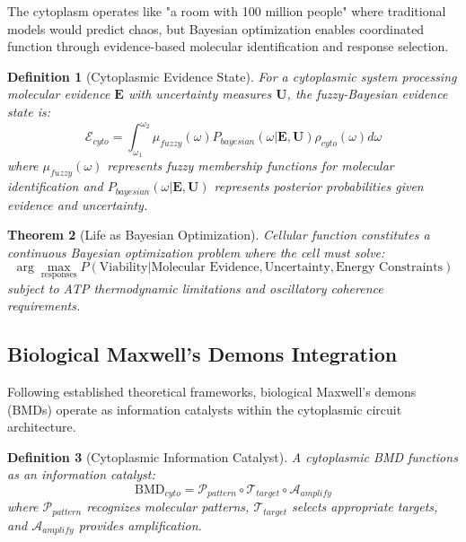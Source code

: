 \documentclass[12pt,a4paper]{article}
\newtheorem{theorem}{Theorem}[section]
\newtheorem{definition}[theorem]{Definition}
\begin{document}
The cytoplasm operates like "a room with 100 million people" where traditional models would predict chaos, but Bayesian optimization enables coordinated function through evidence-based molecular identification and response selection.

\begin{definition}[Cytoplasmic Evidence State]
For a cytoplasmic system processing molecular evidence $\mathbf{E}$ with uncertainty measures $\mathbf{U}$, the fuzzy-Bayesian evidence state is:
\begin{equation}
\mathcal{E}_{cyto} = \int_{\omega_1}^{\omega_2} \mu_{fuzzy}(\omega) P_{bayesian}(\omega | \mathbf{E}, \mathbf{U}) \rho_{cyto}(\omega) d\omega
\end{equation}
where $\mu_{fuzzy}(\omega)$ represents fuzzy membership functions for molecular identification and $P_{bayesian}(\omega | \mathbf{E}, \mathbf{U})$ represents posterior probabilities given evidence and uncertainty.
\end{definition}

\begin{theorem}[Life as Bayesian Optimization]
Cellular function constitutes a continuous Bayesian optimization problem where the cell must solve:
\begin{equation}
\arg\max_{\text{responses}} P(\text{Viability} | \text{Molecular Evidence}, \text{Uncertainty}, \text{Energy Constraints})
\end{equation}
subject to ATP thermodynamic limitations and oscillatory coherence requirements.
\end{theorem}

\subsection{Biological Maxwell's Demons Integration}

Following established theoretical frameworks, biological Maxwell's demons (BMDs) operate as information catalysts within the cytoplasmic circuit architecture.

\begin{definition}[Cytoplasmic Information Catalyst]
A cytoplasmic BMD functions as an information catalyst:
\begin{equation}
\text{BMD}_{cyto} = \mathcal{P}_{pattern} \circ \mathcal{T}_{target} \circ \mathcal{A}_{amplify}
\end{equation}
where $\mathcal{P}_{pattern}$ recognizes molecular patterns, $\mathcal{T}_{target}$ selects appropriate targets, and $\mathcal{A}_{amplify}$ provides amplification.
\end{definition}
\end{document}

